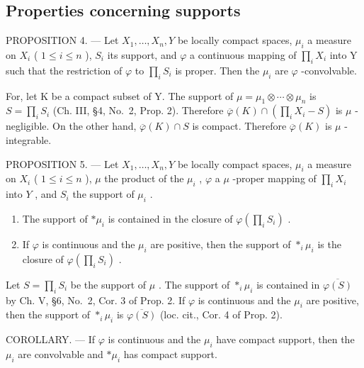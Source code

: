 \subsection{Properties concerning supports}

PROPOSITION 4. --- Let \(X_{1},\ldots,X_{n},Y\) be locally compact spaces, \(\mu_{i}\) a measure on \(X_{i}\) ( \(1\leqslant i\leqslant n\) ), \(S_{i}\) its support, and \(\varphi\) a continuous mapping of \(\prod_{i} X_{i}\) into Y such that the restriction of \(\varphi\) to \(\prod_{i} S_{i}\) is proper. Then the \(\mu_{i}\) are \(\varphi\) -convolvable.

For, let K be a compact subset of Y. The support of \(\mu = \mu_{1} \otimes \cdots \otimes \mu_{n}\) is \(S = \prod_{i} S_{i}\) (Ch. III, §4, No.~2, Prop. 2). Therefore \(\overline{\varphi}(K) \cap \left( \prod_{i} X_{i} - S \right)\) is \(\mu\) -negligible. On the other hand, \(\overline{\varphi}(K) \cap S\) is compact. Therefore \(\overline{\varphi}(K)\) is \(\mu\) -integrable.

PROPOSITION 5. --- Let \(X_1, \ldots, X_n, Y\) be locally compact spaces, \(\mu_i\) a measure on \(X_i\) ( \(1 \leqslant i \leqslant n\) ), \(\mu\) the product of the \(\mu_i\) , \(\varphi\) a \(\mu\) -proper mapping of \(\prod_i X_i\) into \(Y\) , and \(S_i\) the support of \(\mu_i\) .

\begin{enumerate}
\def\labelenumi{\alph{enumi})}
\item
  The support of \(*\mu_i\) is contained in the closure of \(\varphi\left(\prod_{i}S_i\right)\) .
\item
  If \(\varphi\) is continuous and the \(\mu_{i}\) are positive, then the support of \(*_{i} \mu_{i}\) is the closure of \(\varphi\left(\prod_{i} S_{i}\right)\) .
\end{enumerate}

Let \(S = \prod_{i} S_{i}\) be the support of \(\mu\) . The support of \(*_{i} \mu_{i}\) is contained in \(\overline{\varphi(S)}\) by Ch. V, §6, No.~2, Cor. 3 of Prop. 2. If \(\varphi\) is continuous and the \(\mu_{i}\) are positive, then the support of \(*_{i} \mu_{i}\) is \(\overline{\varphi(S)}\) (loc. cit., Cor. 4 of Prop. 2).

COROLLARY. --- If \(\varphi\) is continuous and the \(\mu_{i}\) have compact support, then the \(\mu_{i}\) are convolvable and \(*\mu_{i}\) has compact support.

